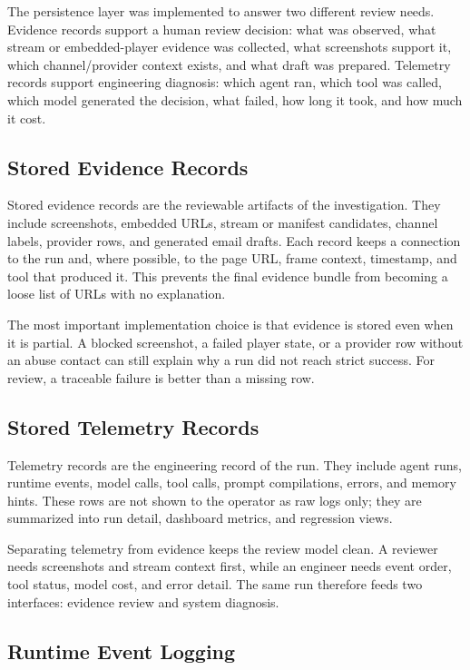 The persistence layer was implemented to answer two different review needs.
Evidence records support a human review decision: what was observed, what
stream or embedded-player evidence was collected, what screenshots support it,
which channel/provider context exists, and what draft was prepared. Telemetry
records support engineering diagnosis: which agent ran, which tool was called,
which model generated the decision, what failed, how long it took, and how much
it cost.



\subsection{Stored Evidence Records}

Stored evidence records are the reviewable artifacts of the investigation.
They include screenshots, embedded URLs, stream or manifest candidates,
channel labels, provider rows, and generated email drafts. Each record keeps a
connection to the run and, where possible, to the page URL, frame context,
timestamp, and tool that produced it. This prevents the final evidence bundle
from becoming a loose list of URLs with no explanation.

The most important implementation choice is that evidence is stored even when
it is partial. A blocked screenshot, a failed player state, or a provider row
without an abuse contact can still explain why a run did not reach strict
success. For review, a traceable failure is better than a missing row.

\subsection{Stored Telemetry Records}

Telemetry records are the engineering record of the run. They include agent
runs, runtime events, model calls, tool calls, prompt compilations, errors,
and memory hints. These rows are not shown to the operator as raw logs only;
they are summarized into run detail, dashboard metrics, and regression views.

Separating telemetry from evidence keeps the review model clean. A reviewer
needs screenshots and stream context first, while an engineer needs event
order, tool status, model cost, and error detail. The same run therefore feeds
two interfaces: evidence review and system diagnosis.

\subsection{Runtime Event Logging}

